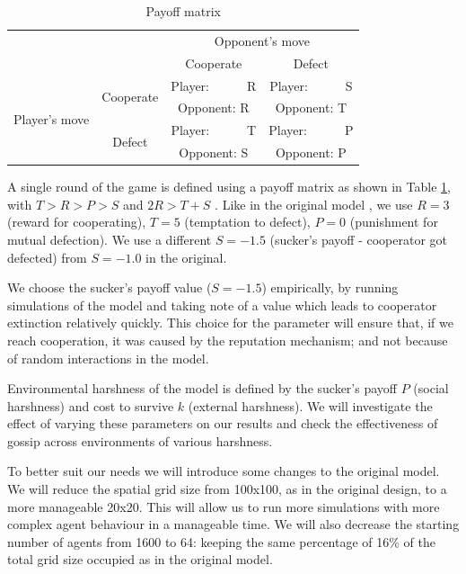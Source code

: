 \documentclass[english]{article}
\begin{document}
\begin{table}[h!]
  \centering
  \begin{tabular}{c c||c|c}
    & & \multicolumn{2}{c}{Opponent's move} \\
    & & Cooperate & Defect \\
    \hline\hline

    \multirow{4}{6em}{Player's move}
    & \multirow{2}{5em}{Cooperate}
      & Player:\ \ \ \ \ \ R & Player:\ \ \ \ \ \ S \\
    & & Opponent: R & Opponent: T \\
    \cline{2-4}
    & \multirow{2}{5em}{Defect}
      & Player:\ \ \ \ \ \ T & Player:\ \ \ \ \ \ P \\
    & & Opponent: S & Opponent: P \\
  \end{tabular}

  \caption{Payoff matrix}
  \label{table:payoff}
\end{table}

A single round of the game is defined using a payoff matrix as shown in Table \ref{table:payoff}, with $T > R > P > S$ and $2R > T + S$ \citep{chammah1965}.
Like in the original model \citep{smaldino},
we use $R = 3$ (reward for cooperating),
$T = 5$ (temptation to defect),
$P = 0$ (punishment for mutual defection).
We use a different $S = -1.5$ (sucker's payoff - cooperator got defected) from $S = -1.0$ in the original.

We choose the sucker's payoff value ($S = -1.5$) empirically,
by running simulations of the model and taking note of a value which leads to cooperator extinction relatively quickly.
This choice for the parameter will ensure that, if we reach cooperation, it was caused by the reputation mechanism;
and not because of random interactions in the model.

Environmental harshness of the model is defined by
the sucker's payoff $P$ (social harshness)
and cost to survive $k$ (external harshness).
We will investigate the effect of varying these parameters on our results
and check the effectiveness of gossip across environments of various harshness.

To better suit our needs we will introduce some changes to the original model.
We will reduce the spatial grid size from 100x100, as in the original design, to a more manageable 20x20.
This will allow us to run more simulations with more complex agent behaviour in a manageable time.
We will also decrease the starting number of agents from 1600 to 64: keeping the same percentage of 16\% of the total grid size occupied as in the original model.
\end{document}
